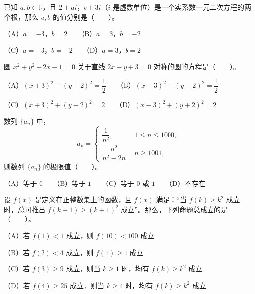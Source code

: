 \begin{question}
已知 $a,b\in\mathbb{R}$，且 $2+ai$，$b+3i$（$i$ 是虚数单位）是一个实系数一元二次方程的两个根，那么 $a,b$ 的值分别是\mbox{（　　）}。

（A）$a=-3$，$b=2$　　（B）$a=3$，$b=-2$

（C）$a=-3$，$b=-2$　　（D）$a=3$，$b=2$

\end{question}
\begin{question}
圆 $x^2+y^2-2x-1=0$ 关于直线 $2x-y+3=0$ 对称的圆的方程是\mbox{（　　）}。

（A）$(x+3)^2+(y-2)^2=\dfrac{1}{2}$　　（B）$(x-3)^2+(y+2)^2=\dfrac{1}{2}$

（C）$(x+3)^2+(y-2)^2=2$　　（D）$(x-3)^2+(y+2)^2=2$

\end{question}
\begin{question}
数列 $\{a_n\}$ 中，
\nopagebreak[4]
\[
a_n=\begin{cases}
\dfrac{1}{n^2},&1\leqslant n\leqslant1000,\\
\dfrac{n^2}{n^2-2n},&n\geqslant1001,
\end{cases}
\]
则数列 $\{a_n\}$ 的极限值\mbox{（　　）}。

（A）等于 $0$　　（B）等于 $1$　　（C）等于 $0$ 或 $1$　　（D）不存在

\end{question}
\begin{question}
设 $f(x)$ 是定义在正整数集上的函数，且 $f(x)$ 满足：“当 $f(k)\geqslant k^2$ 成立时，总可推出 $f(k+1)\geqslant(k+1)^2$ 成立”。那么，下列命题总成立的是\mbox{（　　）}。

（A）若 $f(1)<1$ 成立，则 $f(10)<100$ 成立

（B）若 $f(2)<4$ 成立，则 $f(1)\geqslant1$ 成立

（C）若 $f(3)\geqslant9$ 成立，则当 $k\geqslant1$ 时，均有 $f(k)\geqslant k^2$ 成立

（D）若 $f(4)\geqslant25$ 成立，则当 $k\geqslant4$ 时，均有 $f(k)\geqslant k^2$ 成立

\end{question}

